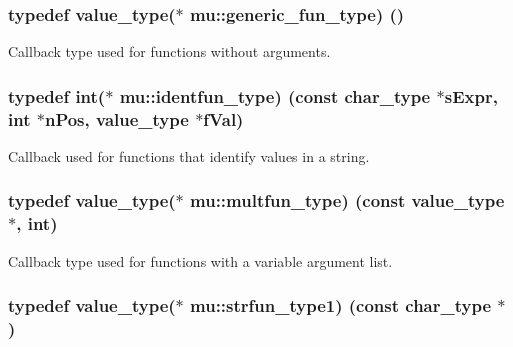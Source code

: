 \subsubsection[{\texorpdfstring{generic\+\_\+fun\+\_\+type}{generic_fun_type}}]{\setlength{\rightskip}{0pt plus 5cm}typedef {\bf value\+\_\+type}($\ast$ mu\+::generic\+\_\+fun\+\_\+type) ()}\hypertarget{namespacemu_ae289766395042975b51dda382cccc907}{}\label{namespacemu_ae289766395042975b51dda382cccc907}


Callback type used for functions without arguments. 

\subsubsection[{\texorpdfstring{identfun\+\_\+type}{identfun_type}}]{\setlength{\rightskip}{0pt plus 5cm}typedef int($\ast$ mu\+::identfun\+\_\+type) (const {\bf char\+\_\+type} $\ast$s\+Expr, int $\ast$n\+Pos, {\bf value\+\_\+type} $\ast$f\+Val)}\hypertarget{namespacemu_a0e40974644c0e6488d76229ca0f4ce23}{}\label{namespacemu_a0e40974644c0e6488d76229ca0f4ce23}


Callback used for functions that identify values in a string. 

\subsubsection[{\texorpdfstring{multfun\+\_\+type}{multfun_type}}]{\setlength{\rightskip}{0pt plus 5cm}typedef {\bf value\+\_\+type}($\ast$ mu\+::multfun\+\_\+type) (const {\bf value\+\_\+type} $\ast$, int)}\hypertarget{namespacemu_a004a9a10d015a8e2e17604cb632cd6c1}{}\label{namespacemu_a004a9a10d015a8e2e17604cb632cd6c1}


Callback type used for functions with a variable argument list. 

\subsubsection[{\texorpdfstring{strfun\+\_\+type1}{strfun_type1}}]{\setlength{\rightskip}{0pt plus 5cm}typedef {\bf value\+\_\+type}($\ast$ mu\+::strfun\+\_\+type1) (const {\bf char\+\_\+type} $\ast$)}\hypertarget{namespacemu_a578b844842f577e78da3f520f9ee2f9a}{}\label{namespacemu_a578b844842f577e78da3f520f9ee2f9a}


